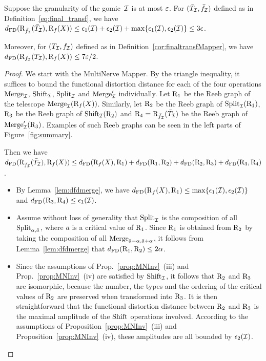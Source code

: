 \begin{thm}\label{th:dfd}
Suppose the granularity of the gomic~$\mathcal{I}$ is at most $\varepsilon$.
For $(\bar T_{\mathcal I},\bar f_{\mathcal I})$ defined as in Definition~\ref{eq:final_transf}, we have
$d_{\rm FD}(\mathrm{R}_{\bar f_{\mathcal I}}(\bar T_{\mathcal I}),\mathrm{R}_f(X))\leq \epsilon_1(\mathcal{I})+\epsilon_2(\mathcal{I})+\max\{\epsilon_1(\mathcal{I}),\epsilon_2(\mathcal{I})\}\leq 3\epsilon$.

Moreover, for $(T_{\mathcal I},f_{\mathcal I})$ defined as in Definition~\ref{cor:finaltransfMapper}, we have
$d_{\rm FD}(\mathrm{R}_{f_{\mathcal I}}(T_{\mathcal I}),\mathrm{R}_f(X))\leq 7\varepsilon/2$.
\end{thm}

\begin{proof}
We start with the MultiNerve Mapper.
By the triangle inequality, it suffices to bound the functional distortion distance for each of the four operations $\mathrm{Merge}_{\mathcal{I}}$,
$\mathrm{Shift}_{\mathcal{I}}$, $\mathrm{Split}_{\mathcal{I}}$ and $\mathrm{Merge}'_{\mathcal{I}}$ individually.
Let $\mathrm{R}_1$ be the Reeb graph of the telescope $\mathrm{Merge}_{\mathcal{I}}(\mathrm{R}_f(X))$.
Similarly, let $\mathrm{R}_2$ be the Reeb graph of $\mathrm{Split}_{\mathcal{I}}(\mathrm{R}_1)$, $\mathrm{R}_3$ be the Reeb graph of $\mathrm{Shift}_{\mathcal{I}}(\mathrm{R}_2)$ 
and $\mathrm{R}_4=\mathrm{R}_{\bar f_{\mathcal I}}(\bar T_{\mathcal I})$ be the Reeb graph of $\mathrm{Merge}'_{\mathcal{I}}(\mathrm{R}_3)$. Examples of such Reeb graphs can be seen in the left
parts of Figure~\ref{fig:summary}.

Then we have
$d_{\rm FD}(\mathrm{R}_{\bar f_{\mathcal I}}(\bar T_{\mathcal I}),\mathrm{R}_f(X))\leq d_{\rm FD}(\mathrm{R}_f(X),\mathrm{R}_1)+d_{\rm FD}(\mathrm{R}_1,\mathrm{R}_2)+d_{\rm FD}(\mathrm{R}_2,\mathrm{R}_3)+d_{\rm FD}(\mathrm{R}_3,\mathrm{R}_4)$.

\begin{itemize}

\item By Lemma~\ref{lem:dfdmerge}, we have $d_{\rm FD}(\mathrm{R}_f(X),\mathrm{R}_1)\leq \max\{\epsilon_1(\mathcal{I}),\epsilon_2(\mathcal{I})\}$
and $d_{\rm FD}(\mathrm{R}_3,\mathrm{R}_4)\leq \epsilon_1(\mathcal{I})$.

\item Assume without loss of generality that $\mathrm{Split}_{\mathcal{I}}$ is the composition of all $\mathrm{Split}_{\alpha,\bar a}$, 
where $\bar a$ is a critical value of $\mathrm{R}_1$. 
Since $\mathrm{R}_1$ is obtained from $\mathrm{R}_2$ by taking the composition of all $\mathrm{Merge}_{\bar a - \alpha,\bar a + \alpha}$,
it follows from Lemma~\ref{lem:dfdmerge} that $d_{\rm FD}(\mathrm{R}_1,\mathrm{R}_2)\leq 2\alpha$.

\item Since the assumptions of Prop.~\ref{prop:MNInv}~(iii) and Prop.~\ref{prop:MNInv}~(iv) are satisfied by $\mathrm{Shift}_{\mathcal{I}}$,
it follows that $\mathrm{R}_2$ and $\mathrm{R}_3$ are isomorphic, because the number, the types and the ordering of the critical values of $\mathrm{R}_2$
are preserved when transformed into $\mathrm{R}_3$. It is then straightforward that the functional distortion distance between
$\mathrm{R}_2$ and $\mathrm{R}_3$ is the maximal amplitude of the $\mathrm{Shift}$ operations involved. According to the assumptions 
of Proposition~\ref{prop:MNInv}~(iii) and Proposition~\ref{prop:MNInv}~(iv),
these amplitudes are all bounded by $\epsilon_2(\mathcal{I})$.


\end{itemize}
\end{proof}
